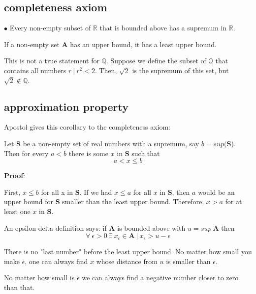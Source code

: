 \documentclass[11pt, oneside]{article}
\begin{document}
\subsection*{completeness axiom}

$\bullet$  Every non-empty subset of $\mathbb{R}$ that is bounded above has a supremum in $\mathbb{R}$.

If a non-empty set $\mathbf{A}$ has an upper bound, it has a least upper bound.

This is not a true statement for $\mathbb{Q}$.  Suppose we define the subset of $\mathbb{Q}$ that contains all numbers $r \ | \ r^2 < 2$.  Then, $\sqrt{2}$ is the supremum of this set, but $\sqrt{2} \notin \mathbb{Q}$.

\subsection*{approximation property}

Apostol gives this corollary to the completeness axiom:  

Let $\mathbf{S}$ be a non-empty set of real numbers with a supremum, say $b = sup(\mathbf{S}$).  Then for every $a < b$ there is some $x$ in $\mathbf{S}$ such that
\[ a < x \le b \]

\textbf{Proof}:  

First, $x \le b$ for all x in $\mathbf{S}$.  If we had $x \le a$ for all $x$ in $\mathbf{S}$, then $a$ would be an upper bound for $\mathbf{S}$ smaller than the least upper bound.  Therefore, $x > a$ for at least one $x$ in $\mathbf{S}$.

An epsilon-delta definition says:  if $\mathbf{A}$ is bounded above with $u = sup \ \mathbf{A}$ then
\[ \forall \ \epsilon > 0 \ \exists \ x_{\epsilon} \in  \mathbf{A} \ | \  x_{\epsilon} > u - \epsilon \]

There is no "last number" before the least upper bound.  No matter how small you make $\epsilon$, one can always find $x$ whose distance from $u$ is smaller than $\epsilon$.

No matter how small is $\epsilon$ we can always find a negative number closer to zero than that.
\end{document}
